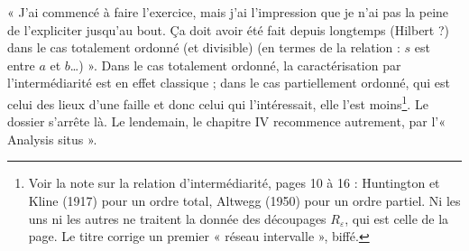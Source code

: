 \documentclass[11pt,a4paper]{article}
\begin{document}
« J'ai commencé à faire l'exercice, mais j'ai l'impression que je n'ai pas la
peine de l'expliciter jusqu'au bout. Ça doit avoir été fait depuis longtemps
(Hilbert ?) dans le cas totalement ordonné (et divisible) (en termes de la
relation : $s$ est entre $a$ et $b$\dots) ». Dans le cas totalement ordonné, la
caractérisation par l'intermédiarité est en effet classique ; dans le cas
partiellement ordonné, qui est celui des lieux d'une faille et donc celui qui
l'intéressait, elle l'est moins\footnote{Voir la note sur la relation
d'intermédiarité, pages 10 à 16 : Huntington et Kline (1917) pour un ordre
total, Altwegg (1950) pour un ordre partiel. Ni les uns ni les autres ne
traitent la donnée des découpages $R_{\varepsilon}$, qui est celle de la page.
Le titre corrige un premier « réseau intervalle », biffé.}. Le dossier s'arrête
là. Le lendemain, le chapitre IV recommence autrement, par l'« Analysis situs ».
\end{document}

